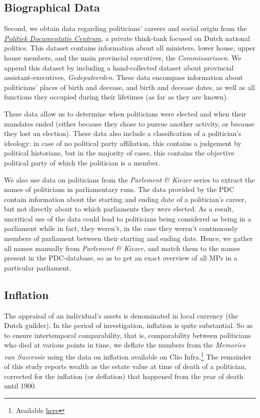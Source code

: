 \subsection{Biographical Data}
    Second, we obtain data regarding politicians' careers and social origin from the \href{www.pdc.nl}{\textit{Politiek Documentatie Centrum}}, a private think-tank focused on Dutch national politics. This dataset contains information about all ministers, lower house, upper house members, and the main provincial executives, the \textit{Commissarissen}. We append this dataset by including a hand-collected dataset about provincial assistant-executives, \textit{Gedeputeerden}. These data encompass information about politicians' places of birth and decease, and birth and decease dates, as well as all functions they occupied during their lifetimes (as far as they are known). 

    These data allow us to determine when politicians were elected and when their mandates ended (either because they chose to pursue another activity, or because they lost an election). These data also include a classification of a politician's ideology: in case of no political party affiliation, this contains a judgement by political historians, but in the majority of cases, this contains the objective political party of which the politician is a member. 

    We also use data on politicians from the \textit{Parlement \& Kiezer} series to extract the names of politicians in parliamentary runs. The data provided by the PDC contain information about the starting and ending date of a politician's career, but not directly about to which parliaments they were elected. As a result, uncritical use of the data could lead to politicians being considered as being in a parliament while in fact, they weren't, in the case they weren't continuously members of parliament between their starting and ending date. Hence, we gather all names manually from \textit{Parlement \& Kiezer}, and match them to the names present in the PDC-database, so as to get an exact overview of all MPs in a particular parliament. 

\subsection{Inflation}
    The appraisal of an individual's assets is denominated in local currency (the Dutch guilder). In the period of investigation, inflation is quite substantial. So as to ensure intertemporal comparability, that is, comparability between politicians who died at various points in time, we deflate the numbers from the \textit{Memories van Successie} using the data on inflation available on Clio Infra.\footnote{Available \href{https://clio-infra.eu/Indicators/Inflation.html}{here}} The remainder of this study reports wealth as the estate value at time of death of a politician, corrected for the inflation (or deflation) that happened from the year of death until 1900. 


